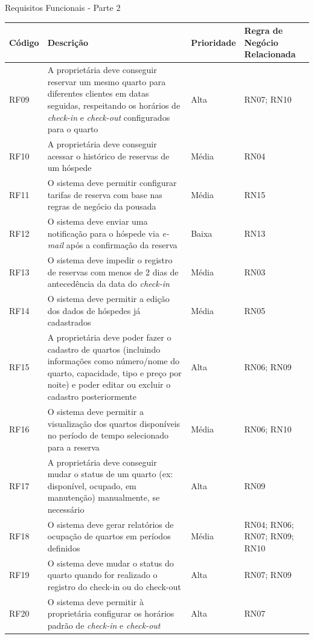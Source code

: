 \documentclass[
	12pt,				%
	openany,			%
	oneside,			%
	a4paper,			%
	english,			%
	french,				%
	spanish,			%
	brazil				%
	]{abntex2}
\begin{document}
\begin{quadro}[H]
	\caption{Requisitos Funcionais - Parte 2}
	\label{quadro_rf2}
	\begin{tabular}{|>{\centering\arraybackslash}p{1.5cm}|p{6.7cm}|>{\centering\arraybackslash}p{2cm}|>{\centering\arraybackslash}p{4cm}|}
		\hline
		\textbf{Código} & \textbf{Descrição} & \textbf{Prioridade} & \textbf{Regra de Negócio Relacionada} \\ \hline

		RF09 & A proprietária deve conseguir reservar um mesmo quarto para diferentes clientes em datas seguidas, respeitando os horários de \textit{check-in} e \textit{check-out} configurados para o quarto & Alta & RN07; RN10\\ \hline
		RF10 & A proprietária deve conseguir acessar o histórico de reservas de um hóspede & Média & RN04 \\ \hline
		RF11 & O sistema deve permitir configurar tarifas de reserva com base nas regras de negócio da pousada & Média & RN15 \\ \hline
		RF12 & O sistema deve enviar uma notificação para o hóspede via \textit{e-mail} após a confirmação da reserva & Baixa & RN13 \\ \hline
		RF13 & O sistema deve impedir o registro de reservas com menos de 2 dias de antecedência da data do \textit{check-in} & Média & RN03 \\ \hline
		RF14 & O sistema deve permitir  a edição dos dados de hóspedes já cadastrados & Média & RN05 \\ \hline 
		RF15 & A proprietária deve poder fazer o cadastro de quartos (incluindo informações como número/nome do quarto, capacidade, tipo e preço por noite) e poder editar ou excluir o cadastro posteriormente & Alta & RN06; RN09
		\\ \hline
		RF16 & O sistema deve permitir a visualização dos quartos disponíveis no período de tempo selecionado para a reserva & Média & RN06; RN10 \\ \hline
		RF17 & A proprietária deve conseguir mudar o status de um quarto (ex: disponível, ocupado, em manutenção) manualmente, se necessário & Alta & RN09 \\ \hline
		RF18 & O sistema deve gerar relatórios de ocupação de quartos em períodos definidos & Média & RN04; RN06; RN07; RN09; RN10 \\ \hline
		RF19 & O sistema deve mudar o status do quarto quando for realizado o registro do check-in ou do check-out & Alta & RN07; RN09 \\ \hline
		RF20 & O sistema deve permitir à proprietária configurar os horários padrão de \textit{check-in} e \textit{check-out} & Alta & RN07 \\ \hline
	\end{tabular}
\end{quadro}
\end{document}
